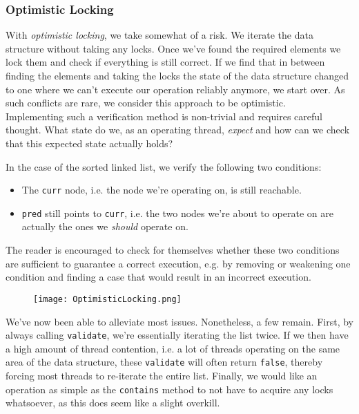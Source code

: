 \documentclass[main]{subfiles}
\begin{document}
\subsubsection{Optimistic Locking}
With \textit{optimistic locking}, we take somewhat of a risk. We iterate the data structure without taking any locks. Once we've found the required elements we lock them and check if everything is still correct. If we find that in between finding the elements and taking the locks the state of the data structure changed to one where we can't execute our operation reliably anymore, we start over. As such conflicts are rare, we consider this approach to be optimistic.\\[3mm]
Implementing such a verification method is non-trivial and requires careful thought. What state do we, as an operating thread, \textit{expect} and how can we check that this expected state actually holds?
\newpage
\begin{example}
    In the case of the sorted linked list, we verify the following two conditions:
    \begin{itemize}
        \item The \texttt{curr} node, i.e. the node we're operating on, is still reachable.
        \item \texttt{pred} still points to \texttt{curr}, i.e. the two nodes we're about to operate on are actually the ones we \textit{should} operate on.
    \end{itemize}
    The reader is encouraged to check for themselves whether these two conditions are sufficient to guarantee a correct execution, e.g. by removing or weakening one condition and finding a case that would result in an incorrect execution.
    \begin{figure}[H]
        \centering
        \texttt{[image: OptimisticLocking.png]}
    \end{figure}
\end{example}
We've now been able to alleviate most issues. Nonetheless, a few remain. First, by always calling \texttt{validate}, we're essentially iterating the list twice. If we then have a high amount of thread contention, i.e. a lot of threads operating on the same area of the data structure, these \texttt{validate} will often return \texttt{false}, thereby forcing most threads to re-iterate the entire list. Finally, we would like an operation as simple as the \texttt{contains} method to not have to acquire any locks whatsoever, as this does seem like a slight overkill.
\end{document}
